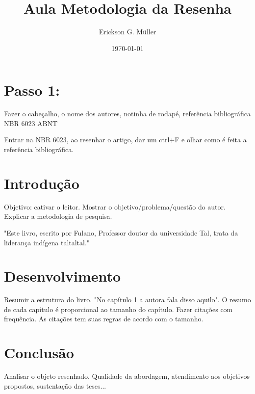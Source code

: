 \documentclass[12pt, a4paper]{article}
\title{Aula Metodologia da Resenha}
\author{Erickson G. Müller}
\date{\today}
\begin{document}
	\maketitle
	\section{Passo 1: }
	Fazer o cabeçalho, o nome dos autores, notinha de rodapé, referência bibliográfica NBR 6023 ABNT

	Entrar na NBR 6023, ao resenhar o artigo, dar um ctrl+F e olhar como é feita a referência bibliográfica.

	\section{Introdução}
		Objetivo: cativar o leitor. Mostrar o objetivo/problema/questão do autor. Explicar a metodologia de pesquisa.

		"Este livro, escrito por Fulano, Professor doutor da universidade Tal, trata da liderança indígena taltaltal."
	\section{Desenvolvimento}
		Resumir a estrutura do livro. "No capítulo 1 a autora fala disso aquilo". O resumo de cada capítulo é proporcional ao tamanho do capítulo. Fazer citações com frequência. As citações tem suas regras de acordo com o tamanho.
	\section{Conclusão}
		Analisar o objeto resenhado. Qualidade da abordagem, atendimento aos objetivos propostos, sustentação das teses...
\end{document}
